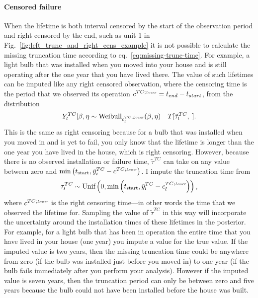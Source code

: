 \paragraph*{Censored failure}
When the lifetime is both interval censored by the start of the observation period and right censored by the end, such as unit 1 in Fig.~\ref{fig:left_trunc_and_right_cens_example} it is not possible to calculate the missing truncation time according to eq.~\eqref{eq:missing-trunc-time}. For example, a light bulb that was installed when you moved into your house and is still operating after the one year that you have lived there. The value of such lifetimes can be imputed like any right censored observation, where the censoring time is the period that we observed its operation $c^{TC;\textit{\tiny{Lower}}} = t_{end} - t_{start}$, from the distribution
\begin{equation}
    Y^{TC}_l|\beta, \eta \sim \hbox{Weibull}_{c^{TC;\textit{\tiny{Lower}}}_{l}}(\beta, \eta) \quad T[\tilde{\tau}^{TC}_l, \;]. 
\end{equation}
This is the same as right censoring because for a bulb that was installed when you moved in and is yet to fail, you only know that the lifetime is longer than the one year you have lived in the house, which is right censoring. However, because there is no observed installation or failure time, $\tilde{\tau}^{TC}$ can take on any value between zero and $\min\left(t_\text{start}, \tilde{y}^{TC}_i - c^{TC;\textit{\tiny{Lower}}}\right)$. I impute the truncation time from
\begin{equation}
    \label{eq:imp-trun-times}
    \tau^{TC}_l \sim \hbox{Unif}\left(0, \min\left(t_\text{start}, \tilde{y}^{TC}_l - c^{TC;\textit{\tiny{Lower}}}_l\right)\right),
\end{equation}
where $c^{TC;\textit{\tiny{Lower}}}$ is the right censoring time---in other words the time that we observed the lifetime for. Sampling the value of $\tilde{\tau}^{TC}$ in this way will incorporate the uncertainty around the installation times of these lifetimes in the posterior. For example, for a light bulb that has been in operation the entire time that you have lived in your house (one year) you impute a value for the true value. If the imputed value is two years, then the missing truncation time could be anywhere from zero (if the bulb was installed just before you moved in) to one year (if the bulb fails immediately after you perform your analysis). However if the imputed value is seven years, then the truncation period can only be between zero and five years because the bulb could not have been installed before the house was built.

